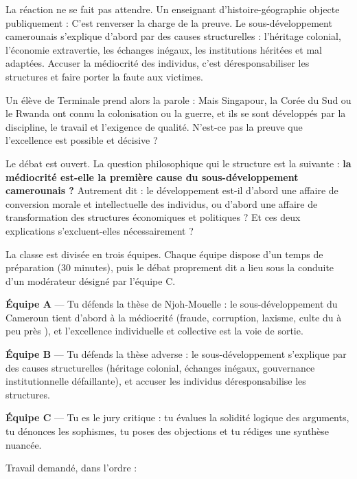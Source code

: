 \documentclass[11pt]{article}
\newcounter{popsec}
\newcounter{popsub}
\newcommand{\courssub}[1]{%
  \stepcounter{popsub}%
  \par\vspace{9pt}\noindent{\popxbold\fontsize{11.5}{13}\selectfont\color{popink}{\color{poporange}\thepopsec.\thepopsub}\hspace{6pt}#1}\par\nopagebreak\vspace{4pt}
}
\begin{document}
La réaction ne se fait pas attendre. Un enseignant d'histoire-géographie objecte publiquement : \guillemotleft C'est renverser la charge de la preuve. Le sous-développement camerounais s'explique d'abord par des causes structurelles : l'héritage colonial, l'économie extravertie, les échanges inégaux, les institutions héritées et mal adaptées. Accuser la médiocrité des individus, c'est déresponsabiliser les structures et faire porter la faute aux victimes. \guillemotright

Un élève de Terminale prend alors la parole : \guillemotleft Mais Singapour, la Corée du Sud ou le Rwanda ont connu la colonisation ou la guerre, et ils se sont développés par la discipline, le travail et l'exigence de qualité. N'est-ce pas la preuve que l'excellence est possible et décisive ? \guillemotright

Le débat est ouvert. La question philosophique qui le structure est la suivante : \textbf{la médiocrité est-elle la première cause du sous-développement camerounais ?} Autrement dit : le développement est-il d'abord une affaire de conversion morale et intellectuelle des individus, ou d'abord une affaire de transformation des structures économiques et politiques ? Et ces deux explications s'excluent-elles nécessairement ?

\courssub{Consignes}

La classe est divisée en trois équipes. Chaque équipe dispose d'un temps de préparation (30 minutes), puis le débat proprement dit a lieu sous la conduite d'un modérateur désigné par l'équipe C.

\textbf{Équipe A} — Tu défends la thèse de Njoh-Mouelle : le sous-développement du Cameroun tient d'abord à la médiocrité (fraude, corruption, laxisme, culte du \guillemotleft à peu près \guillemotright), et l'excellence individuelle et collective est la voie de sortie.

\textbf{Équipe B} — Tu défends la thèse adverse : le sous-développement s'explique par des causes structurelles (héritage colonial, échanges inégaux, gouvernance institutionnelle défaillante), et accuser les individus déresponsabilise les structures.

\textbf{Équipe C} — Tu es le jury critique : tu évalues la solidité logique des arguments, tu dénonces les sophismes, tu poses des objections et tu rédiges une synthèse nuancée.

Travail demandé, dans l'ordre :
\end{document}
